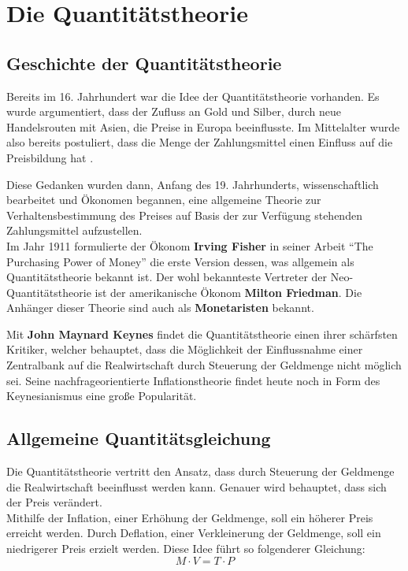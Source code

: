 \chapter{Die Quantitätstheorie}

\section{Geschichte der Quantitätstheorie}
Bereits im 16. Jahrhundert war die Idee der Quantitätstheorie vorhanden. Es wurde argumentiert, dass der Zufluss an Gold und Silber, durch neue Handelsrouten mit Asien, die Preise in Europa beeinflusste. Im Mittelalter wurde also bereits postuliert, dass die Menge der Zahlungsmittel einen Einfluss auf die Preisbildung hat \autocite{Woll1977}.

Diese Gedanken wurden dann, Anfang des 19. Jahrhunderts, wissenschaftlich bearbeitet und Ökonomen begannen, eine allgemeine Theorie zur Verhaltensbestimmung des Preises auf Basis der zur Verfügung stehenden Zahlungsmittel aufzustellen.\\
Im Jahr 1911 formulierte der Ökonom \textbf{Irving Fisher} in seiner Arbeit \enquote{The Purchasing Power of Money} die erste Version dessen, was allgemein als Quantitätstheorie bekannt ist. Der wohl bekannteste Vertreter der Neo-Quantitätstheorie ist der amerikanische Ökonom \textbf{Milton Friedman}. Die Anhänger dieser Theorie sind auch als \textbf{Monetaristen} bekannt.

Mit \textbf{John Maynard Keynes} findet die Quantitätstheorie einen ihrer schärfsten Kritiker, welcher behauptet, dass die Möglichkeit der Einflussnahme einer Zentralbank auf die Realwirtschaft durch Steuerung der Geldmenge nicht möglich sei. Seine nachfrageorientierte Inflationstheorie findet heute noch in Form des Keynesianismus eine große Popularität.

\section{Allgemeine Quantitätsgleichung}

Die Quantitätstheorie vertritt den Ansatz, dass durch Steuerung der Geldmenge die Realwirtschaft beeinflusst werden kann. Genauer wird behauptet, dass sich der Preis verändert. \\
Mithilfe der Inflation, einer Erhöhung der Geldmenge, soll ein höherer Preis erreicht werden. Durch Deflation, einer Verkleinerung der Geldmenge, soll ein niedrigerer Preis erzielt werden. Diese Idee führt so folgenderer Gleichung:
\begin{equation}
    \tag{Allg. Quantitätsgleichung}
    M \cdot V = T \cdot P
\end{equation}\label{allg. Q-Formel}

